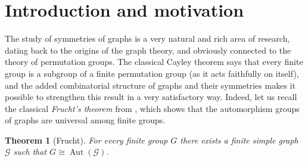 \documentclass[12pt]{amsart}
\newtheorem*{nonothm}{Theorem}
\theoremstyle{definition}
\theoremstyle{definition}
\theoremstyle{definition}
\theoremstyle{definition}
\DeclareMathOperator{\Aut}{Aut}
\newcommand{\Gr}{\mathcal{G}}
\numberwithin{equation}{section}
\begin{document}
\maketitle

\section{Introduction and motivation}

The study of symmetries of graphs is a very natural and rich area of research, dating back to the origins of the graph theory, and obviously connected to the theory of permutation groups. The classical Cayley theorem says that every finite group is a subgroup of a finite permutation group (as it acts faithfully on itself), and the added combinatorial structure of graphs and their symmetries makes it possible to strengthen this result in a very satisfactory way. Indeed, let us recall the classical {\it Frucht's theorem} from \cite{Fru39}, which shows that the automorphism groups of graphs are universal among finite groups.

\begin{nonothm} [Frucht]
For every finite group $G$ there exists a finite simple graph $\Gr$ such that $G \cong \Aut(\Gr)$.    
\end{nonothm}
\end{document}
